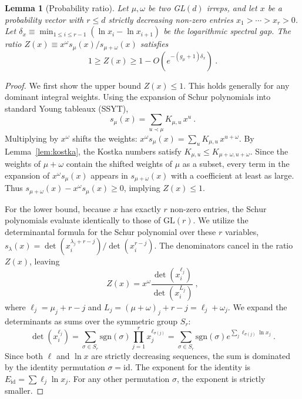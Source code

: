 \documentclass[11pt,letterpaper]{article}
\newtheorem{lem}{Lemma}
\begin{document}
\begin{lem}[Probability ratio]\label{lem:ratio}
    Let $\mu,\omega$ be two GL$(d)$ irreps, and let $x$ be a probability vector with $r \le d$ strictly decreasing non-zero entries $x_1>\cdots>x_r>0$. Let $\delta_x \equiv \min_{1 \le i \le r-1} (\ln x_i - \ln x_{i+1})$ be the logarithmic spectral gap. The ratio $Z(x)\equiv x^\omega s_\mu(x)/s_{\mu+\omega}(x)$ satisfies
    \begin{equation}
        1 \ge Z(x) \ge 1 - O\left(e^{-(  g_\mu+1)\delta_x}\right)\ .
    \end{equation}
\end{lem}

\begin{proof}
    We first show the upper bound $Z(x)\leq 1$. This holds generally for any dominant integral weights. Using the expansion of Schur polynomials into standard Young tableaux (SSYT),
    \begin{equation}
        s_\mu(x) = \sum_{u\prec\mu} K_{\mu,u}\,x^u\ .
    \end{equation}
    Multiplying by $x^\omega$ shifts the weights: $x^\omega s_\mu(x) = \sum_{u} K_{\mu,u}\,x^{u+\omega}$. By Lemma~\ref{lem:kostka}, the Kostka numbers satisfy $K_{\mu,u} \leq K_{\mu+\omega, u+\omega}$. Since the weights of $\mu+\omega$ contain the shifted weights of $\mu$ as a subset, every term in the expansion of $x^\omega s_\mu(x)$ appears in $s_{\mu+\omega}(x)$ with a coefficient at least as large. Thus $s_{\mu+\omega}(x) - x^\omega s_\mu(x) \ge 0$, implying $Z(x) \leq 1$.

    For the lower bound, because $x$ has exactly $r$ non-zero entries, the Schur polynomials evaluate identically to those of $\mathrm{GL}(r)$. We utilize the determinantal formula for the Schur polynomial over these $r$ variables, $s_\lambda(x) = \det(x_i^{\lambda_j+r-j}) / \det(x_i^{r-j})$. The denominators cancel in the ratio $Z(x)$, leaving
    \begin{equation}
        Z(x) = x^\omega \frac{\det(x_i^{\ell_j})}{\det(x_i^{L_j})} \ ,
    \end{equation}
    where $\ell_j = \mu_j + r - j$ and $L_j = (\mu+\omega)_j + r - j = \ell_j + \omega_j$. We expand the determinants as sums over the symmetric group $S_r$:
    \begin{equation}
        \det(x_i^{\ell_j}) = \sum_{\sigma\in S_r} \mathrm{sgn}(\sigma) \prod_{j=1}^r x_j^{\ell_{\sigma(j)}} = \sum_{\sigma\in S_r} \mathrm{sgn}(\sigma) e^{\sum_{j} \ell_{\sigma(j)} \ln x_j} \ .
    \end{equation}
    Since both $\ell$ and $\ln x$ are strictly decreasing sequences, the sum is dominated by the identity permutation $\sigma = \mathrm{id}$. The exponent for the identity is $E_{\mathrm{id}} = \sum \ell_j \ln x_j$. For any other permutation $\sigma$, the exponent is strictly smaller.
    

\end{proof}
\end{document}

